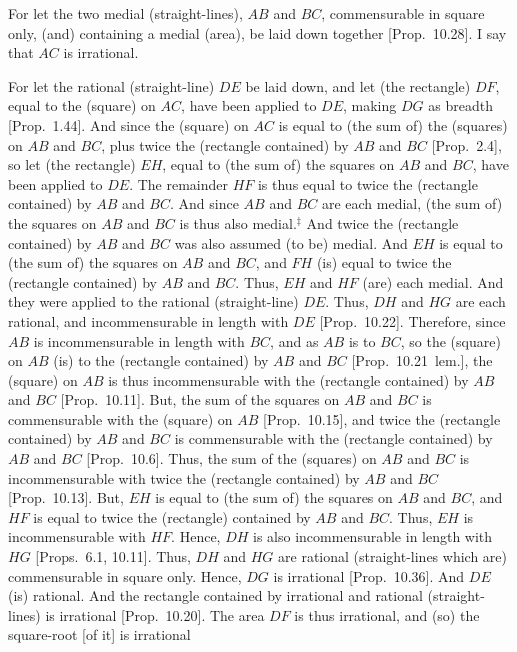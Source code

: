 \epsfysize=1.7in
\centerline{}

For let the  two medial (straight-lines), $AB$ and $BC$, 
commensurable in square only, (and) containing a medial (area), be laid down together [Prop.~10.28]. I say that $AC$ is irrational.

For let the rational (straight-line) $DE$ be laid down, and let (the rectangle) $DF$, equal
to the (square) on $AC$, have been applied to $DE$, making $DG$ as breadth
[Prop.~1.44]. And since the
(square) on $AC$ is equal to (the sum of) the (squares) on $AB$ and $BC$,
plus twice the (rectangle contained) by $AB$ and $BC$ [Prop.~2.4], so let (the rectangle) $EH$, equal to
(the sum of) the squares on $AB$ and $BC$, have been applied
to $DE$. The remainder $HF$ is thus equal to twice the (rectangle contained)
by $AB$ and $BC$. And since $AB$ and $BC$ are each medial, (the
sum of) the squares on $AB$ and $BC$ is thus also medial.$^\ddag$ And twice the (rectangle contained) by $AB$ and $BC$ was also assumed (to be) medial.
And $EH$ is equal to (the sum of) the squares on $AB$ and $BC$, and
$FH$ (is) equal to twice the (rectangle contained) by $AB$ and $BC$. 
Thus, $EH$ and $HF$ (are) each medial. And they were applied to the
rational (straight-line) $DE$. Thus, $DH$ and $HG$ are
each rational, and incommensurable in length with $DE$ [Prop.~10.22]. Therefore, since $AB$ is incommensurable in length with $BC$, and as $AB$ is to $BC$, so the
(square) on $AB$ (is) to the (rectangle contained) by $AB$ and $BC$ [Prop.~10.21~lem.], the (square) on $AB$
is thus incommensurable with the (rectangle contained) by $AB$ and $BC$
[Prop.~10.11]. But, the sum of the squares on $AB$ and $BC$ is commensurable with the (square) on $AB$ [Prop.~10.15], and twice the (rectangle contained)
by $AB$ and $BC$ is commensurable with the (rectangle contained) by $AB$ and $BC$ [Prop.~10.6]. Thus, the sum of
the (squares) on $AB$ and $BC$ is incommensurable with twice the (rectangle
contained) by $AB$ and $BC$ [Prop.~10.13].
But, $EH$ is equal to (the sum of) the squares on $AB$ and $BC$,
and $HF$ is equal to twice the (rectangle) contained by $AB$ and $BC$. Thus, $EH$ is incommensurable with $HF$. Hence, $DH$ is also
incommensurable in length with $HG$ [Props.~6.1, 10.11]. Thus, $DH$ and 
$HG$ are rational (straight-lines which are) commensurable in square only.
Hence, $DG$ is irrational [Prop.~10.36].
And  $DE$ (is) rational. And the rectangle contained by irrational and
rational (straight-lines) is irrational [Prop.~10.20].
The area $DF$ is thus irrational, and (so) the square-root [of it] is irrational
